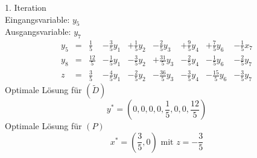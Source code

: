 \documentclass[a4paper]{scrartcl}
\begin{document}
\begin{enumerate}[label=\bfseries\arabic*.]
        1. Iteration \\
        Eingangsvariable: $y_5$ \\
        Ausgangsvariable: $y_7$
        \begin{equation}
            \begin{array}{rcrrrrrrr}
                y_5 & = & \frac{1}{5} & -\frac{3}{5}y_1 & +\frac{1}{5}y_2 & -\frac{2}{5}y_3 & +\frac{9}{5}y_4 & +\frac{7}{5}y_6 & -\frac{1}{5}x_7 \\
                y_8 & = & \frac{12}{5} & -\frac{1}{5}y_1 & -\frac{3}{5}y_2 & +\frac{31}{5}y_3 & -\frac{2}{5}y_4 & -\frac{1}{5}y_6 & -\frac{2}{5}y_7 \\
                \hline
                z & = & \frac{3}{5} & -\frac{4}{5}y_1 & -\frac{2}{5}y_2 & -\frac{36}{5}y_3 & -\frac{3}{5}y_4 & -\frac{15}{5}y_6 & -\frac{3}{5}y_7
            \end{array}
        \end{equation}
        Optimale Lösung für $(\tilde D)$ \\
        \begin{equation}
            y^* = \left( 0, 0, 0, 0, \frac{1}{5}, 0, 0, \frac{12}{5} \right)
        \end{equation}
        Optimale Lösung für $(P)$ \\
        \begin{equation}
            x^* = \left( \frac{3}{5}, 0 \right) \text{ mit } z = -\frac{3}{5}
        \end{equation}

\end{enumerate}
\end{document}
